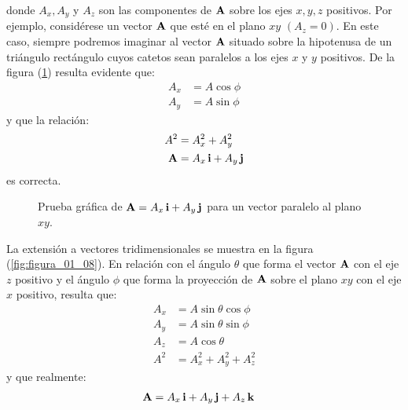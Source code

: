 \documentclass[12pt]{article}
\begin{document}
donde $A_{x}, A_{y}$ y $A_{z}$ son las componentes de $\vb{A}$ sobre los ejes $x, y, z$ positivos. Por ejemplo, considérese un vector $\vb{A}$ que esté en el plano $x y$ $(A_{z} = 0)$. En este caso, siempre podremos imaginar al vector $\vb{A}$ situado sobre la hipotenusa de un triángulo rectángulo cuyos catetos sean paralelos a los ejes $x$ y $y$ positivos. De la figura (\ref{fig:figura_01_07}) resulta evidente que:
\begin{align}
    A_{x} &= A \cos \phi \label{eq:ecuacion_01_08} \\
    A_{y} &= A \sin \phi \label{eq:ecuacion_01_09}
\end{align}
y que la relación:
\begin{align}
    A^{2} &= A_{x}^{2} + A_{y}^{2} \label{eq:ecuacion_01_10} \\
    \vb{A} &= A_{x} \, \vb{i} + A_{y} \, \vb{j} \label{eq:ecuacion_01_11}
\end{align}
es correcta.
\begin{figure}[H]
    \centering
    \caption{Prueba gráfica de $\vb{A} = A_{x} \, \vb{i} + A_{y} \, \vb{j}$ para un vector paralelo al plano $x y$.}
    \label{fig:figura_01_07}
\end{figure}
La extensión a vectores tridimensionales se muestra en la figura (\ref{fig:figura_01_08}). En relación con el ángulo $\theta$ que forma el vector $\vb{A}$ con el eje $z$ positivo y el ángulo $\phi$ que forma la proyección de $\vb{A}$ sobre el plano $x y$ con el eje $x$ positivo, resulta que:
\begin{align}
    A_{x} &= A \sin \theta \cos \phi \label{eq:ecuacion_01_12} \\[0.5em]
    A_{y} &= A \sin \theta \sin \phi \label{eq:ecuacion_01_13} \\[0.5em]
    A_{z} &= A \cos \theta \label{eq:ecuacion_01_14} \\[0.5em]
    A^{2} &= A_{x}^{2} + A_{y}^{2} + A_{z}^{2} \label{eq:ecuacion_01_15}
\end{align}
y que realmente:
\begin{align*}
    \vb{A} &= A_{x} \, \vb{i} + A_{y} \, \vb{j} + A_{z} \, \vb{k}
\end{align*}
\end{document}
